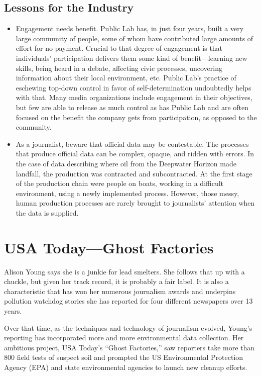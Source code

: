 \section{Lessons for the Industry}
\begin{itemize}
\item Engagement needs benefit.
Public Lab has, in just four years, built a very large community of
people, some of whom have contributed large amounts of effort for
no payment. Crucial to that degree of engagement is that individuals'
participation delivers them some kind of benefit—learning new skills,
being heard in a debate, affecting civic processes, uncovering information
about their local environment, etc. Public Lab's practice of
eschewing top-down control in favor of self-determination undoubtedly
helps with that. Many media organizations include engagement
in their objectives, but few are able to release as much control as has
Public Lab and are often focused on the benefit the company gets
from participation, as opposed to the community.
\item As a journalist, beware that official data may be contestable.
The processes that produce official data can be complex, opaque, and
ridden with errors. In the case of data describing where oil from the
Deepwater Horizon made landfall, the production was contracted and
subcontracted. At the first stage of the production chain were people
on boats, working in a difficult environment, using a newly implemented
process. However, those messy, human production processes
are rarely brought to journalists' attention when the data is supplied.
\end{itemize}

\chapter{USA Today—Ghost Factories}
Alison Young says she is a junkie for lead smelters. She follows that up with
a chuckle, but given her track record, it is probably a fair label. It is also a
characteristic that has won her numerous journalism awards and underpins
pollution watchdog stories she has reported for four different newspapers
over 13 years.

Over that time, as the techniques and technology of journalism evolved,
Young's reporting has incorporated more and more environmental data
collection. Her ambitious project, USA Today's ``Ghost Factories,'' saw
reporters take more than 800 field tests of suspect soil and prompted the
US Environmental Protection Agency (EPA) and state environmental agencies
to launch new cleanup efforts.


